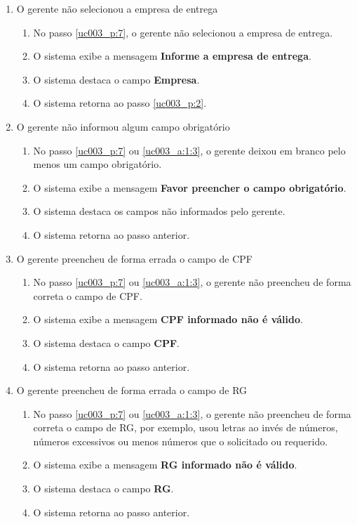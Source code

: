 \begin{enumerate}[label=E\arabic*]
	\item O gerente não selecionou a empresa de entrega \label{uc003_e:1}
	\begin{enumerate}[label*=.\arabic*]
		\item[] No passo \ref{uc003_p:7}, o gerente não selecionou a empresa de entrega.
		\item O sistema exibe a mensagem \textbf{Informe a empresa de entrega}.
		\item O sistema destaca o campo \textbf{Empresa}.
		\item O sistema retorna ao passo \ref{uc003_p:2}.
	\end{enumerate}
	
	\item O gerente não informou algum campo obrigatório \label{uc003_e:2}
	\begin{enumerate}[label*=.\arabic*]
		\item[] No passo \ref{uc003_p:7} ou \ref{uc003_a:1:3}, o gerente deixou em branco pelo menos um campo obrigatório.
		\item O sistema exibe a mensagem \textbf{Favor preencher o campo obrigatório}.
		\item O sistema destaca os campos não informados pelo gerente.
		\item O sistema retorna ao passo anterior.
	\end{enumerate}

	\item O gerente preencheu de forma errada o campo de CPF \label{uc003_e:3}
	\begin{enumerate}[label*=.\arabic*]		
		\item[] No passo \ref{uc003_p:7} ou \ref{uc003_a:1:3}, o gerente não preencheu de forma correta o campo de CPF.		
		\item O sistema exibe a mensagem \textbf{CPF informado não é válido}.
		\item O sistema destaca o campo \textbf{CPF}.
		\item O sistema retorna ao passo anterior.
	\end{enumerate}

	\item O gerente preencheu de forma errada o campo de RG \label{uc003_e:4}
	\begin{enumerate}[label*=.\arabic*]		
		\item[] No passo \ref{uc003_p:7} ou \ref{uc003_a:1:3}, o gerente não preencheu de forma correta o campo de RG, por exemplo, usou letras ao invés de números, números excessivos ou menos números que o solicitado ou requerido.		
		\item O sistema exibe a mensagem \textbf{RG informado não é válido}.
		\item O sistema destaca o campo \textbf{RG}.
		\item O sistema retorna ao passo anterior.
	\end{enumerate}
		

\end{enumerate}
